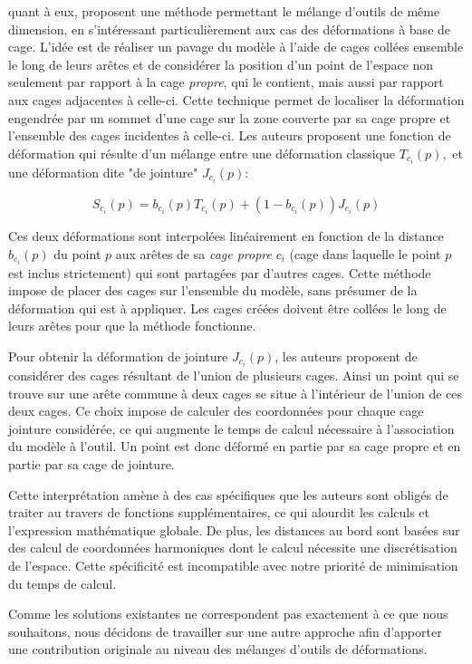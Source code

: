 \cite{GPCP13} quant à eux, proposent une méthode permettant le mélange
d'outils de même dimension, en s'intéressant particulièrement aux cas des
déformations à base de cage. L'idée est de réaliser un pavage du modèle à
l'aide de cages collées ensemble le long de leurs arêtes et de considérer la
position d'un point de l'espace non seulement par rapport à la cage
\textit{propre}, qui le contient, mais aussi par rapport aux cages adjacentes
à celle-ci. Cette technique permet de localiser la déformation engendrée par
un sommet d'une cage sur la zone couverte par sa cage propre et l'ensemble des
cages incidentes à celle-ci. Les auteurs proposent une fonction de déformation
qui résulte d'un mélange entre une déformation classique $T_{c_i}(p),$ et une
déformation dite "de jointure" $J_{c_i}(p)$:

\begin{equation}
  S_{c_i}(p) = b_{c_i}(p) T_{c_i}(p) + (1-b_{c_i}(p)) J_{c_i}(p)
\end{equation}

Ces deux déformations sont interpolées linéairement en fonction de la distance
$b_{c_i}(p)$ du point $p$ aux arêtes de sa \textit{cage propre} $c_i$ (cage
dans laquelle le point $p$ est inclus strictement) qui sont partagées par
d'autres cages. Cette méthode impose de placer des cages sur l'ensemble du
modèle, sans présumer de la déformation qui est à appliquer. Les cages créées
doivent être collées le long de leurs arêtes pour que la méthode fonctionne.

Pour obtenir la déformation de jointure $J_{c_i}(p)$, les auteurs proposent de
considérer des cages résultant de l'union de plusieurs cages. Ainsi un point
qui se trouve sur une arête commune à deux cages se situe à l'intérieur de
l'union de ces deux cages. Ce choix impose de calculer des coordonnées pour
chaque cage jointure considérée, ce qui augmente le temps de calcul nécessaire
à l'association du modèle à l'outil. Un point est donc déformé en partie par
sa cage propre et en partie par sa cage de jointure.

Cette interprétation amène à des cas spécifiques que les auteurs sont obligés
de traiter au travers de fonctions supplémentaires, ce qui alourdit les
calculs et l'expression mathématique globale. De plus, les distances au bord
sont basées sur des calcul de coordonnées harmoniques dont le calcul nécessite une
discrétisation de l'espace. Cette spécificité est incompatible avec notre
priorité de minimisation du temps de calcul.

Comme les solutions existantes ne correspondent pas exactement à ce que nous
souhaitons, nous décidons de travailler sur une autre approche afin
d'apporter une contribution originale au niveau des mélanges d'outils de
déformations. 

